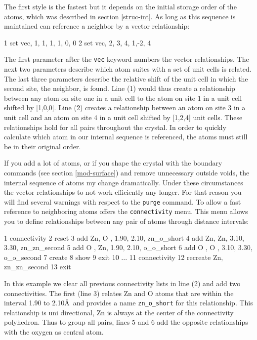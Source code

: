 The first style is the fastest but it depends on the initial storage 
order of the atoms, which was described in section \ref{struc-int}. As
long as this sequence is maintained \Discus can reference a neighbor by
a vector relationship:

\begin{MacVerbatim} 
  1   set vec, 1,  1, 1,   1, 0, 0
  2   set vec, 2,  3, 4,   1,-2, 4
\end{MacVerbatim} 

The first parameter after the {\tt vec} keyword numbers the vector 
relationships. The next two parameters describe which atom suites with
a set of unit cells is related. The last three parameters describe the 
relative shift of the unit cell in which the second site, the neighbor, 
is found.  Line (1) would thus create a relationship between any atom
on site one in a unit cell to the atom on site 1 in a unit cell 
shifted by [1,0,0]. Line (2) creates a relationship between an atom
on site 3 in a unit cell and an atom on site 4 in a unit cell shifted 
by [1,$\overline{2}$,4] unit cells. These relationships hold for all
pairs throughout the crystal. In order to quickly calculate which 
atom in our internal sequence is referenced, the atoms must still be in 
their original order.

If you add a lot of atoms, or if you shape the crystal with the 
boundary commands (see section \ref{mod-surface}) and remove 
unnecessary outside voids, the internal sequence of atoms my change
dramatically. Under these circumstances the vector relationships 
to not work efficiently any longer. For that reason you will find 
several warnings with respect to the {\tt purge} command. To allow
a fast reference to neighboring atoms \Discus offers the 
{\tt connectivity} menu. This menu allows you to define relationships
between any pair of atoms through distance intervals:

\begin{MacVerbatim} 
  1   connectivity
  2      reset
  3      add  Zn, O , 1.90, 2.10, zn_o_short
  4      add  Zn, Zn, 3.10, 3.30, zn_zn_second
  5      add  O , Zn, 1.90, 2.10, o_o_short
  6      add  O , O , 3.10, 3.30, o_o_second
  7      create
  8      show
  9   exit
 10   ...
 11   connectivity
 12      recreate Zn, zn_zn_second
 13   exit
\end{MacVerbatim} 

In this example we clear all previous connectivity lists in line (2) and
add two connectivities. The first (line 3) relates Zn and O atoms that are within 
the interval 1.90 to 2.10\AA\  and provides a name {\tt zn\_o\_short} 
for this relationship. This relationship is uni directional, Zn is 
always at the center of the connectivity polyhedron. Thus to group 
all pairs, lines 5 and 6 add the opposite relationships with the oxygen 
as central atom.


